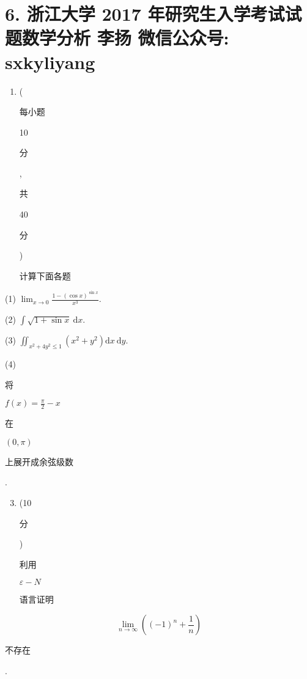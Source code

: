 \documentclass[10pt]{article}
\begin{document}
\section{6. 浙江大学 2017 年研究生入学考试试题数学分析 
 李扬 
 微信公众号: sxkyliyang}
\begin{enumerate}
  \item (\begin{CJK}{UTF8}{mj}每小题\end{CJK} 10 \begin{CJK}{UTF8}{mj}分\end{CJK}, \begin{CJK}{UTF8}{mj}共\end{CJK} 40 \begin{CJK}{UTF8}{mj}分\end{CJK}) \begin{CJK}{UTF8}{mj}计算下面各题\end{CJK}
\end{enumerate}
(1) $\lim _{x \rightarrow 0} \frac{1-(\cos x)^{\sin x}}{x^{3}}$.

(2) $\int \sqrt{1+\sin x} \mathrm{~d} x$.

(3) $\iint_{x^{2}+4 y^{2} \leqslant 1}\left(x^{2}+y^{2}\right) \mathrm{d} x \mathrm{~d} y$.

(4) \begin{CJK}{UTF8}{mj}将\end{CJK} $f(x)=\frac{\pi}{2}-x$ \begin{CJK}{UTF8}{mj}在\end{CJK} $(0, \pi)$ \begin{CJK}{UTF8}{mj}上展开成余弦级数\end{CJK}.

\begin{enumerate}
  \setcounter{enumi}{2}
  \item (10 \begin{CJK}{UTF8}{mj}分\end{CJK}) \begin{CJK}{UTF8}{mj}利用\end{CJK} $\varepsilon-N$ \begin{CJK}{UTF8}{mj}语言证明\end{CJK}
\end{enumerate}
$$
\lim _{n \rightarrow \infty}\left((-1)^{n}+\frac{1}{n}\right)
$$
\begin{CJK}{UTF8}{mj}不存在\end{CJK}.
\end{document}

